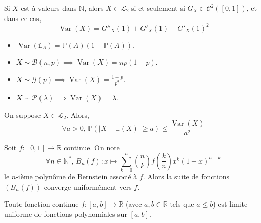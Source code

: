 
  \begin{proposition}
    Si $X$ est à valeurs dans $\mathbb{N}$, alors $X \in \mathcal{L}_2$ si et seulement si $G_X \in \mathcal{C}^2([0,1])$, et dans ce cas,
    \[ \operatorname{Var}(X) = G''_X(1) + G'_X(1) - G'_X(1)^2 \]
  \end{proposition}


  \begin{example}
    \begin{itemize}
      \item $\operatorname{Var}(\mathbb{1}_A) = \mathbb{P}(A)(1-\mathbb{P}(A))$.
      \item $X \sim \mathcal{B}(n, p) \implies \operatorname{Var}(X) = np (1-p)$.
      \item $X \sim \mathcal{G}(p) \implies \operatorname{Var}(X) = \frac{1-p}{p^2}$.
      \item $X \sim \mathcal{P}(\lambda) \implies \operatorname{Var}(X) = \lambda$.
    \end{itemize}
  \end{example}


  \begin{proposition}
    On suppose $X \in \mathcal{L}_2$. Alors,
    \[ \forall a > 0, \, \mathbb{P}(\vert X - \mathbb{E}(X) \vert \geq a) \leq \frac{\operatorname{Var}(X)}{a^2} \]
  \end{proposition}


  \begin{theorem}
    Soit $f : [0,1] \rightarrow \mathbb{R}$ continue. On note
    \[ \forall n \in \mathbb{N}^*, \, B_n(f) : x \mapsto \sum_{k=0}^n \binom{n}{k} f \left( \frac{k}{n} \right) x^k (1-x)^{n-k} \]
    le $n$-ième polynôme de Bernstein associé à $f$. Alors la suite de fonctions $(B_n(f))$ converge uniformément vers $f$.
  \end{theorem}

  \begin{theorem}
    Toute fonction continue $f : [a,b] \rightarrow \mathbb{R}$ (avec $a, b \in \mathbb{R}$ tels que $a \leq b$) est limite uniforme de fonctions polynomiales sur $[a, b]$.
  \end{theorem}


